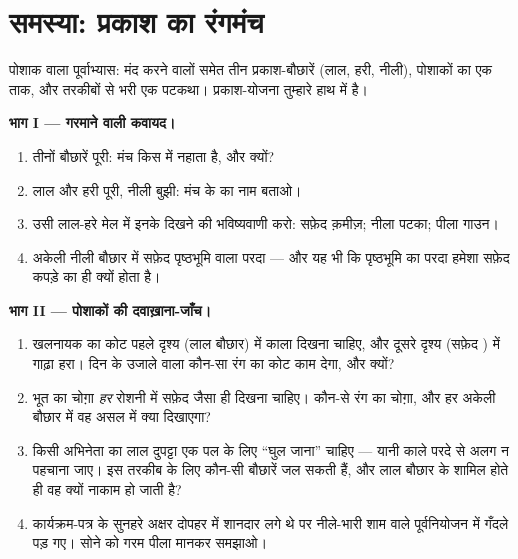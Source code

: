 \section{समस्या: प्रकाश का रंगमंच}

\begin{problem}\label{pb:g8:colors-spectra:1}
पोशाक वाला पूर्वाभ्यास: मंद करने वालों समेत तीन प्रकाश-बौछारें (लाल,
हरी, नीली), पोशाकों का एक ताक, और तरकीबों से भरी एक पटकथा।
प्रकाश-योजना तुम्हारे हाथ में है।

\medskip\noindent\textbf{भाग I --- गरमाने वाली कवायद।}
\begin{enumerate}
  \item तीनों बौछारें पूरी: मंच किस  में नहाता है, और क्यों?
  \item लाल और हरी पूरी, नीली बुझी: मंच के  का नाम बताओ।
  \item उसी लाल-हरे मेल में इनके दिखने की भविष्यवाणी करो: सफ़ेद
        क़मीज़; नीला पटका; पीला गाउन।
  \item अकेली नीली बौछार में सफ़ेद पृष्ठभूमि वाला परदा --- और यह भी
        कि पृष्ठभूमि का परदा हमेशा सफ़ेद कपड़े का ही क्यों होता है।
\end{enumerate}

\medskip\noindent\textbf{भाग II --- पोशाकों की दवाख़ाना-जाँच।}
\begin{enumerate}[resume]
  \item खलनायक का कोट पहले दृश्य (लाल बौछार) में काला दिखना चाहिए,
        और दूसरे दृश्य (सफ़ेद ) में गाढ़ा हरा। दिन के उजाले
        वाला कौन-सा रंग का कोट काम देगा, और क्यों?
  \item भूत का चोग़ा \emph{हर} रोशनी में सफ़ेद जैसा ही दिखना चाहिए।
        कौन-से रंग का चोग़ा, और हर अकेली बौछार में वह असल में क्या
        दिखाएगा?
  \item किसी अभिनेता का लाल दुपट्टा एक पल के लिए ``घुल जाना'' चाहिए
        --- यानी काले परदे से अलग न पहचाना जाए। इस तरकीब के लिए
        कौन-सी बौछारें जल सकती हैं, और लाल बौछार के शामिल होते ही वह
        क्यों नाकाम हो जाती है?
  \item कार्यक्रम-पत्र के सुनहरे अक्षर दोपहर में शानदार लगे थे पर
        नीले-भारी शाम वाले पूर्वनियोजन में गँदले पड़ गए। सोने को गरम
        पीला मानकर समझाओ।
\end{enumerate}


\end{problem}
